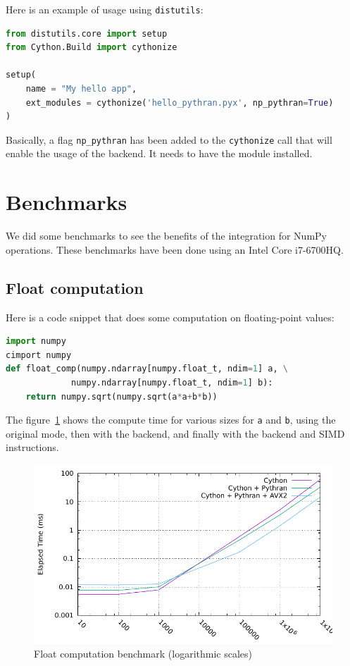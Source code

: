 \documentclass{deliverablereport}
\begin{document}
Here is an example of usage using {\tt distutils}:

\begin{lstlisting}[language=python]
from distutils.core import setup
from Cython.Build import cythonize

setup(
    name = "My hello app",
    ext_modules = cythonize('hello_pythran.pyx', np_pythran=True)
)
\end{lstlisting}

Basically, a flag {\tt np\_pythran} has been added to the {\tt cythonize} call
that will enable the usage of the \Pythran backend. It needs to have the \Pythran
module installed.

\section{Benchmarks}

We did some benchmarks to see the benefits of the \Pythran integration for NumPy
operations. These benchmarks have been done using an Intel Core i7-6700HQ.

\subsection{Float computation}

Here is a code snippet that does some computation on floating-point values:

\begin{lstlisting}[language=python]
import numpy
cimport numpy
def float_comp(numpy.ndarray[numpy.float_t, ndim=1] a, \
             numpy.ndarray[numpy.float_t, ndim=1] b):
    return numpy.sqrt(numpy.sqrt(a*a+b*b))
\end{lstlisting}

The figure~\ref{fig:float_bench} shows the compute time for various sizes for
{\tt a} and {\tt b}, using the original \Cython mode, then \Cython with the
\Pythran backend, and finally \Cython with the \Pythran backend and SIMD
instructions.

\begin{figure}[h]
  \caption{\label{fig:float_bench} Float computation benchmark (logarithmic scales)}
  \includegraphics{benchs/float/graph.pdf}
\end{figure}
\end{document}
